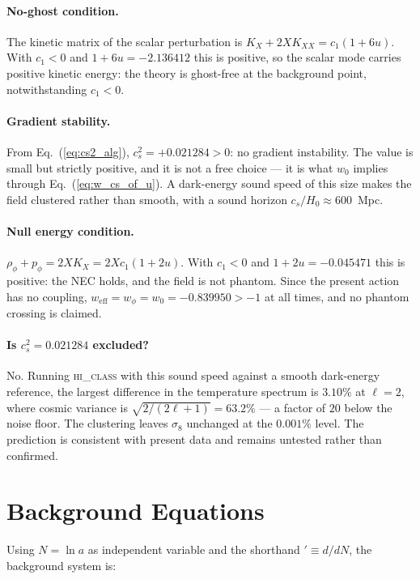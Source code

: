 \documentclass[12pt,a4paper]{article}
\newcommand{\weff}{w_{\mathrm{eff}}}
\newcommand{\wphi}{w_\phi}
\begin{document}
\paragraph{No-ghost condition.}
The kinetic matrix of the scalar perturbation is $K_X + 2XK_{XX} =
c_1(1+6u)$.  With $c_1<0$ and $1+6u = -2.136412$ this is positive, so the
scalar mode carries positive kinetic energy: the theory is ghost-free at
the background point, notwithstanding $c_1<0$.

\paragraph{Gradient stability.}
From Eq.~(\ref{eq:cs2_alg}), $c_s^2 = +0.021284 > 0$: no gradient
instability.  The value is small but strictly positive, and it is not a
free choice --- it is what $w_0$ implies through Eq.~(\ref{eq:w_cs_of_u}).
A dark-energy sound speed of this size makes the field clustered rather
than smooth, with a sound horizon $c_s/H_0 \approx 600$~Mpc.

\paragraph{Null energy condition.}
$\rho_\phi + p_\phi = 2XK_X = 2Xc_1(1+2u)$.  With $c_1<0$ and
$1+2u=-0.045471$ this is positive: the NEC holds, and the field is not
phantom.  Since the present action has no coupling, $\weff = \wphi = w_0
= -0.839950 > -1$ at all times, and no phantom crossing is claimed.

\paragraph{Is $c_s^2 = 0.021284$ excluded?}
No.  Running \textsc{hi\_class} with this sound speed against a smooth
dark-energy reference, the largest difference in the temperature spectrum
is $3.10\%$ at $\ell = 2$, where cosmic variance is $\sqrt{2/(2\ell+1)} =
63.2\%$ --- a factor of $20$ below the noise floor.  The clustering leaves
$\sigma_8$ unchanged at the $0.001\%$ level.  The prediction is
consistent with present data and remains untested rather than confirmed.
\section{Background Equations}
\label{sec:background}

Using $N = \ln a$ as independent variable and the shorthand
${}' \equiv d/dN$, the background system is:
\end{document}
